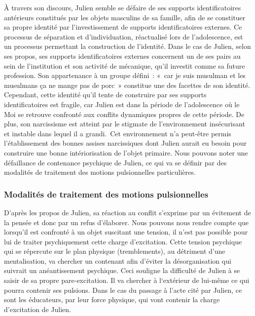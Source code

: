 \documentclass[12pt, a4paper]{book}
\begin{document}
\begin{spacing}{1.5}
À travers son discours, Julien semble se défaire de ses supports identificatoires antérieurs constitués par les objets masculins de sa famille, afin de se constituer sa propre identité par l'investissement de supports identificatoires externes. Ce processus de séparation et d'individuation, réactualisé lors de l'adolescence, est un processus permettant la construction de l'identité. Dans le cas de Julien, selon ses propos, ses supports identificatoires externes concernent un de ses pairs au sein de l'institution et son activité de mécanique, qu'il investit comme sa future profession. Son appartenance à un groupe défini : « car je suis musulman et les musulmans ça ne mange pas de porc » constitue une des facettes de son identité. Cependant, cette identité qu'il tente de construire par ses supports identificatoires est fragile, car Julien est dans la période de l'adolescence où le Moi se retrouve confronté aux conflits dynamiques propres de cette période. De plus, son narcissisme est atteint par le stigmate de l'environnement insécurisant et instable dans lequel il a grandi. Cet environnement n'a peut-être permis l'établissement des bonnes assises narcissiques dont Julien aurait eu besoin pour construire une bonne intériorisation de l'objet primaire. Nous pouvons noter une défaillance de contenance psychique de Julien, ce qui va se définir par des modalités de traitement des motions pulsionnelles particulières.

\subsubsection{Modalités de traitement des motions pulsionnelles}

D'après les propos de Julien, sa réaction au conflit s'exprime par un évitement de la pensée et donc par un refus d'élaborer. Nous pouvons nous rendre compte que lorsqu'il est confronté à un objet suscitant une tension, il n'est pas possible pour lui de traiter psychiquement cette charge d'excitation. Cette tension psychique qui se répercute sur le plan physique (tremblements), au détriment d'une mentalisation, va chercher un contenant afin d'éviter la désorganisation qui suivrait un anéantissement psychique. Ceci souligne la difficulté de Julien à se saisir de sa propre pare-excitation. Il va chercher à l‘extérieur de lui-même ce qui pourra contenir ses pulsions. Dans le cas du passage à l'acte cité par Julien, ce sont les éducateurs, par leur  force  physique, qui vont contenir la charge d'excitation de Julien.


\end{spacing}
\end{document}
